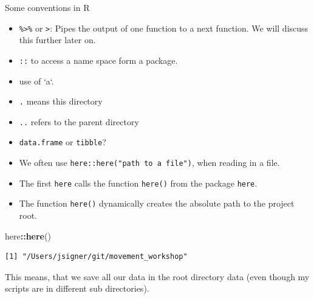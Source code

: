 \documentclass[ignorenonframetext,,t]{beamer}
\let\oldtextbf\textbf
\renewcommand{\textbf}[1]{\textcolor{spamwell}{\oldtextbf{#1}}}
\providecommand{\tightlist}{%
\setlength{\itemsep}{0pt}\setlength{\parskip}{0pt}}
\newenvironment{Shaded}{\begin{snugshade}}{\end{snugshade}}
\newcommand{\FunctionTok}[1]{\textcolor[rgb]{0.13,0.29,0.53}{\textbf{#1}}}
\newcommand{\NormalTok}[1]{#1}
\newcommand{\SpecialCharTok}[1]{\textcolor[rgb]{0.81,0.36,0.00}{\textbf{#1}}}
\providecommand{\tightlist}{%
\setlength{\itemsep}{0pt}\setlength{\parskip}{0pt}}
\renewcommand{\tightlist}{\setlength{\itemsep}{1.4ex}\setlength{\parskip}{0pt}}
\begin{document}
\begin{frame}[fragile]{Some conventions in R}
\label{some-conventions-in-r}
\begin{itemize}
\tightlist
\item
  \texttt{\%\textgreater{}\%} or \texttt{\textbar{}\textgreater{}}:
  Pipes the output of one function to a next function. We will discuss
  this further later on.
\item
  \texttt{::} to access a name space form a package.
\item
  use of `a`.
\item
  \texttt{.} means this directory
\item
  \texttt{..} refers to the parent directory
\item
  \texttt{data.frame} or \texttt{tibble}?
\end{itemize}
\end{frame}

\begin{frame}[fragile]
\begin{itemize}
\tightlist
\item
  We often use \texttt{here::here("path\ to\ a\ file")}, when reading in
  a file.
\item
  The first \texttt{here} calls the function \texttt{here()} from the
  package \texttt{here}.
\item
  The function \texttt{here()} dynamically creates the absolute path to
  the project root.
\end{itemize}

\begin{Shaded}
\begin{Highlighting}[]
\NormalTok{here}\SpecialCharTok{::}\FunctionTok{here}\NormalTok{()}
\end{Highlighting}
\end{Shaded}

\begin{verbatim}
[1] "/Users/jsigner/git/movement_workshop"
\end{verbatim}

This means, that we save all our data in the root directory data (even
though my scripts are in different sub directories).
\end{frame}
\end{document}
